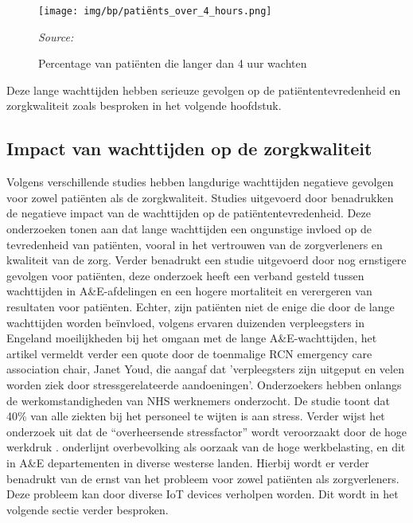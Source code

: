 \begin{figure}[h]
    \centering
    \texttt{[image: img/bp/patiënts\_over\_4\_hours.png]}
    \caption{Percentage van patiënten die langer dan 4 uur wachten}
    \label{fig:Figuur12}
    \textit{Source: \autocite{Baker2024}}
\end{figure}

Deze lange wachttijden hebben serieuze gevolgen op de patiëntentevredenheid en zorgkwaliteit zoals besproken in het volgende hoofdstuk.

\subsection{Impact van wachttijden op de zorgkwaliteit}
Volgens verschillende studies hebben langdurige wachttijden negatieve gevolgen voor zowel patiënten als de zorgkwaliteit. Studies uitgevoerd door \autocite{Vainieri2020, QuintonJ.Nottingham2018, Bleustein2014} benadrukken de negatieve impact van de wachttijden op de patiëntentevredenheid. Deze onderzoeken tonen aan dat lange wachttijden een ongunstige invloed op de tevredenheid van patiënten, vooral in het vertrouwen van de zorgverleners en kwaliteit van de zorg. Verder benadrukt een studie uitgevoerd door \autocite{Paling2020} nog ernstigere gevolgen voor patiënten, deze onderzoek heeft een verband gesteld tussen wachttijden in A\&E-afdelingen en een hogere mortaliteit en verergeren van resultaten voor patiënten. Echter, zijn patiënten niet de enige die door de lange wachttijden worden beïnvloed, volgens \autocite{Osborne2015} ervaren duizenden verpleegsters in Engeland moeilijkheden bij het omgaan met de lange A\&E-wachttijden, het artikel vermeldt verder een quote door de toenmalige RCN emergency care association chair, Janet Youd, die aangaf dat 'verpleegsters zijn uitgeput en velen worden ziek door stressgerelateerde aandoeningen'. Onderzoekers hebben onlangs de werkomstandigheden van NHS werknemers onderzocht. De studie toont dat 40\% van alle ziekten bij het personeel te wijten is aan stress. Verder wijst het onderzoek uit dat de “overheersende stressfactor” wordt veroorzaakt door de hoge werkdruk \autocite{Ravalier2020}. \autocite{Vainieri2020} onderlijnt overbevolking als oorzaak van de hoge werkbelasting, en dit in A\&E departementen in diverse westerse landen. Hierbij wordt er verder benadrukt van de ernst van het probleem voor zowel patiënten als zorgverleners. Deze probleem kan door diverse IoT devices verholpen worden. Dit wordt in het volgende sectie verder besproken. 


